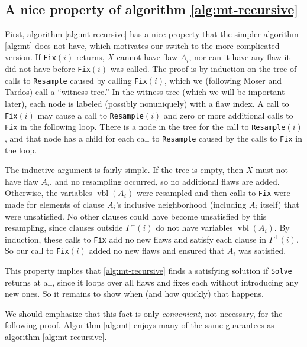 \documentclass{article}
\begin{document}
\subsection{A nice property of algorithm \ref{alg:mt-recursive}}
First, algorithm \ref{alg:mt-recursive} has a nice property that the simpler algorithm \ref{alg:mt} does not have, which motivates our switch to the more complicated version.  If \texttt{Fix}$(i)$ returns, $X$ cannot have flaw $A_i$, nor can it have any flaw it did not have before \texttt{Fix}$(i)$ was called.  The proof is by induction on the tree of calls to \texttt{Resample} caused by calling \texttt{Fix}$(i)$, which we (following Moser and Tardos) call a ``witness tree.''  In the witness tree (which we will be important later), each node is labeled (possibly nonuniquely) with a flaw index.  A call to \texttt{Fix}$(i)$ may cause a call to \texttt{Resample}$(i)$ and zero or more additional calls to \texttt{Fix} in the following loop.  There is a node in the tree for the call to \texttt{Resample}$(i)$, and that node has a child for each call to \texttt{Resample} caused by the calls to \texttt{Fix} in the loop.

The inductive argument is fairly simple.  If the tree is empty, then $X$ must not have flaw $A_i$, and no resampling occurred, so no additional flaws are added.  Otherwise, the variables $\operatorname{vbl}(A_i)$ were resampled and then calls to \texttt{Fix} were made for elements of clause $A_i$'s inclusive neighborhood (including $A_i$ itself) that were unsatisfied.  No other clauses could have become unsatisfied by this resampling, since clauses outside $\Gamma^{+}(i)$ do not have variables $\operatorname{vbl}(A_i)$.  By induction, these calls to \texttt{Fix} add no new flaws and satisfy each clause in $\Gamma^{+}(i)$.  So our call to \texttt{Fix}$(i)$ added no new flaws and ensured that $A_i$ was satisfied.

This property implies that \ref{alg:mt-recursive} finds a satisfying solution if \texttt{Solve} returns at all, since it loops over all flaws and fixes each without introducing any new ones.  So it remains to show when (and how quickly) that happens.

We should emphasize that this fact is only \emph{convenient}, not necessary, for the following proof.  Algorithm \ref{alg:mt} enjoys many of the same guarantees as algorithm \ref{alg:mt-recursive}.
\end{document}

